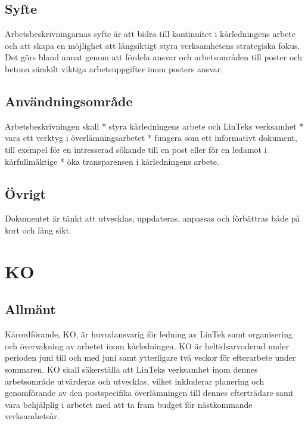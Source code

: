 \hypertarget{syfte}{%
\subsection{Syfte}\label{syfte}}

Arbetsbeskrivningarnas syfte är att bidra till kontinuitet i
kårledningens arbete och att skapa en möjlighet att långsiktigt styra
verksamhetens strategiska fokus. Det görs bland annat genom att fördela
ansvar och arbetsområden till poster och betona särskilt viktiga
arbetsuppgifter inom posters ansvar.

\hypertarget{anvuxe4ndningsomruxe5de}{%
\subsection{Användningsområde}\label{anvuxe4ndningsomruxe5de}}

Arbetsbeskrivningen skall * styra kårledningens arbete och LinTeks
verksamhet * vara ett verktyg i överlämningsarbetet * fungera som ett
informativt dokument, till exempel för en intresserad sökande till en
post eller för en ledamot i kårfullmäktige * öka transparensen i
kårledningens arbete.

\hypertarget{uxf6vrigt}{%
\subsection{Övrigt}\label{uxf6vrigt}}

Dokumentet är tänkt att utvecklas, uppdateras, anpassas och förbättras
både på kort och lång sikt.

\hypertarget{ko}{%
\section{KO}\label{ko}}

\hypertarget{allmuxe4nt}{%
\subsection{Allmänt}\label{allmuxe4nt}}

Kårordförande, KO, är huvudansvarig för ledning av LinTek samt
organisering och övervakning av arbetet inom kårledningen. KO är
heltidsarvoderad under perioden juni till och med juni samt ytterligare
två veckor för efterarbete under sommaren. KO skall säkerställa att
LinTeks verksamhet inom dennes arbetsområde utvärderas och utvecklas,
vilket inkluderar planering och genomförande av den postspecifika
överlämningen till dennes efterträdare samt vara behjälplig i arbetet
med att ta fram budget för nästkommande verksamhetsår.

